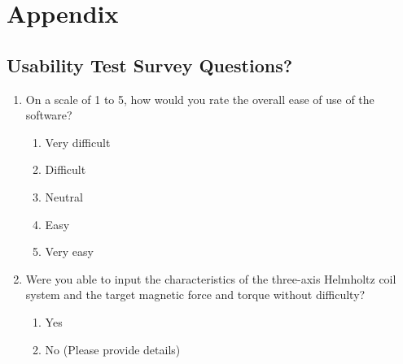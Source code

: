 \documentclass[12pt, titlepage]{article}
\begin{document}




\newpage

\section{Appendix}

\subsection{Usability Test Survey Questions?}\label{subsec:UsabilitySurvery}
\begin{enumerate}
    \item On a scale of 1 to 5, how would you rate the overall ease of use of the software?
    \begin{enumerate}
        \item Very difficult
        \item Difficult
        \item Neutral
        \item Easy
        \item Very easy
    \end{enumerate}

    \item Were you able to input the characteristics of the three-axis Helmholtz coil system and the target magnetic force and torque without difficulty?
    \begin{enumerate}
        \item Yes
        \item No (Please provide details)
    \end{enumerate}


\end{enumerate}
\end{document}
